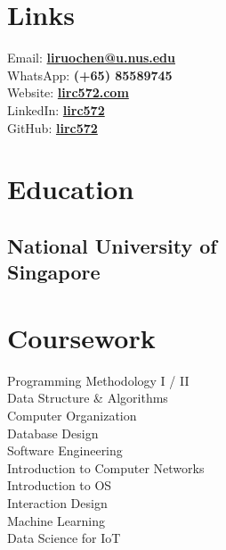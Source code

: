 \documentclass[]{deedy-resume-openfont}
\begin{document}
%
%
\lastupdated

%
%

%
%

\begin{minipage}[t]{0.33\textwidth}


\section{Links}

Email:  \href{mailto:liruochen@u.nus.edu}{\bf liruochen@u.nus.edu} \\
WhatsApp:  {\bf (+65) 85589745} \\
Website:  \href{https://lirc572.com}{\bf lirc572.com} \\
LinkedIn: \href{https://linkedin.com/in/lirc572}{\bf lirc572} \\
GitHub: \href{https://github.com/lirc572}{\bf lirc572} \\
\sectionsep


\section{Education}

\subsection{National University of \\
Singapore}
\sectionsep


\section{Coursework}

Programming Methodology I / II \\
Data Structure \& Algorithms \\
Computer Organization \\
Database Design \\
Software Engineering \\
Introduction to Computer Networks \\
Introduction to OS \\
Interaction Design \\
Machine Learning \\
Data Science for IoT \\
\sectionsep


\end{minipage}
\end{document}
